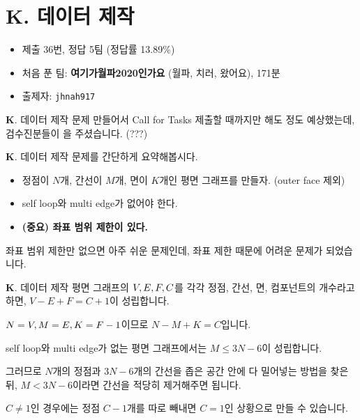 \section{K. 데이터 제작}

\begin{frame} %
    \begin{itemize}
        \item 제출 36번, 정답 5팀 (정답률 13.89\%)
        \item 처음 푼 팀: \textbf{여기가월파2020인가요} (월파, 치러, 왔어요), 171분
        \item 출제자: \texttt{jhnah917}
    \end{itemize}
\end{frame}

\begin{frame}{\textbf{K}. 데이터 제작}
    문제 만들어서 Call for Tasks 제출할 때까지만 해도 정도 예상했는데, 검수진분들이 을 주셨습니다. (???)
\end{frame}

\begin{frame}{\textbf{K}. 데이터 제작}
    문제를 간단하게 요약해봅시다.
    
    \vspace{18pt}
    
    \begin{itemize}
        \item 정점이 $N$개, 간선이 $M$개, 면이 $K$개인 평면 그래프를 만들자. (outer face 제외)
        \item self loop와 multi edge가 없어야 한다.
        \item \textbf{(중요) 좌표 범위 제한이 있다.}
    \end{itemize}
    
    \vspace{18pt}
    
    좌표 범위 제한만 없으면 아주 쉬운 문제인데, 좌표 제한 때문에 어려운 문제가 되었습니다.
\end{frame}

\begin{frame}{\textbf{K}. 데이터 제작}
    평면 그래프의 $V, \space E, \space F, \space C$를 각각 정점, 간선, 면, 컴포넌트의 개수라고 하면, $V-E+F=C+1$이 성립합니다.

    
    $N = V, \space M = E, \space K = F-1$이므로 $N-M+K=C$입니다.
    
    \vspace{18pt}
    
    self loop와 multi edge가 없는 평면 그래프에서는 $M \leq 3N-6$이 성립합니다.
    
    그러므로 $N$개의 정점과 $3N-6$개의 간선을 좁은 공간 안에 다 밀어넣는 방법을 찾은 뒤, $M < 3N-6$이라면 간선을 적당히 제거해주면 됩니다.
    
    \vspace{18pt}
    
    $C \neq 1$인 경우에는 정점 $C-1$개를 따로 빼내면 $C = 1$인 상황으로 만들 수 있습니다.
\end{frame}

